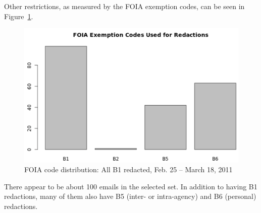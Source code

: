 \documentclass[journal]{vgtc}                %
\begin{document}
Other restrictions, as measured by the FOIA exemption codes, can be seen in Figure~\ref{fig:FOIAB12011LibyaBuildup}.
\begin{figure}[h]
\begin{center}
\includegraphics[width=0.95\linewidth]{FOIAB12011LibyaBuildup}
\caption{FOIA code distribution: All  B1 redacted, Feb. 25 -- March 18, 2011}
\label{fig:FOIAB12011LibyaBuildup}
\end{center}
\end{figure}
There appear to be about 100 emails in the selected set.  In addition to having B1 redactions, many of them also have B5 (inter- or intra-agency) and B6 (personal) redactions.
\end{document}
